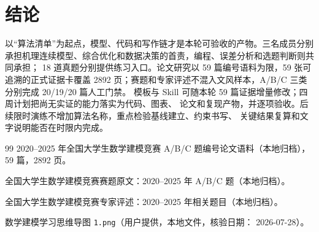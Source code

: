 \section{结论}

以“算法清单”为起点，模型、代码和写作链才是本轮可验收的产物。三名成员分别
承担机理连续模型、综合优化和数据决策的首责，编程、误差分析和选题判断则共同承担；
18 道真题分别提供练习入口。论文研究以 59 篇编号语料为限，59 张可追溯的正式证据卡覆盖
2892 页；赛题和专家评述不混入文风样本，A/B/C 三类分别完成 20/19/20 篇人工门禁。
模板与 Skill 可随本轮 59 篇证据增量修改；四周计划把尚无实证的能力落实为代码、图表、
论文和复现产物，并逐项验收。后续限时演练不增加算法名称，重点检验基线建立、约束书写、
关键结果复算和文字说明能否在时限内完成。

\begin{thebibliography}{99}
2020--2025 年全国大学生数学建模竞赛 A/B/C 题编号论文语料（本地归档），
59 篇，2892 页。

全国大学生数学建模竞赛赛题原文：2020--2025 年 A/B/C 题（本地归档）。

全国大学生数学建模竞赛专家评述：2020--2025 年相关题目（本地归档）。

数学建模学习思维导图 \texttt{1.png}（用户提供，本地文件，核验日期：
2026-07-28）。
\end{thebibliography}

\appendix
